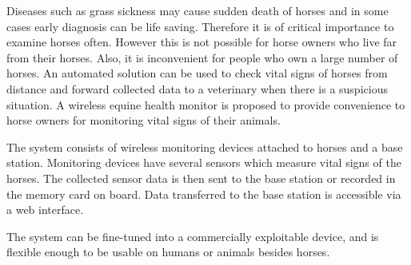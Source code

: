 Diseases such as grass sickness may cause sudden death of horses and in some cases early diagnosis can be life saving. Therefore it is of critical importance to examine horses often. However this is not possible for horse owners who live far from their horses. Also, it is inconvenient for people who own a large number of horses. An automated solution can be used to check vital signs of horses from distance and forward collected data to a veterinary when there is a suspicious situation. A wireless equine health monitor is proposed to provide convenience to horse owners for monitoring vital signs of their animals. 

The system consists of wireless monitoring devices attached to horses and a base station. Monitoring devices have several sensors which measure vital signs of the horses. The collected sensor data is then sent to the base station or recorded in the memory card on board. Data transferred to the base station is accessible via a web interface. 

The system can be fine-tuned into a commercially exploitable device, and is flexible enough to be usable on humans or animals besides horses.
